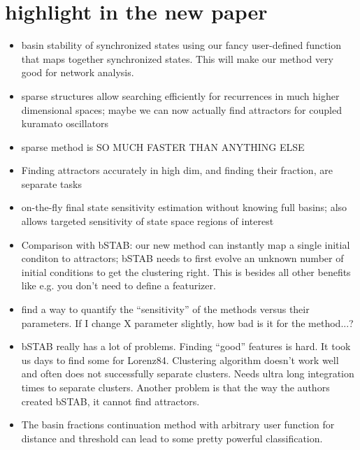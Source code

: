 \documentclass{article}
\begin{document}
\section{highlight in the new paper}
\begin{itemize}
    \item basin stability of synchronized states using our fancy user-defined function that maps together synchronized states. This will make our method very good for network analysis.
    \item sparse structures allow searching efficiently for recurrences in much higher dimensional spaces; maybe we can now actually find attractors for coupled kuramato oscillators
    \item sparse method is SO MUCH FASTER THAN ANYTHING ELSE
    \item Finding attractors accurately in high dim, and finding their fraction, are separate tasks
    \item on-the-fly final state sensitivity estimation without knowing full basins; also allows targeted sensitivity of state space regions of interest
    \item Comparison with bSTAB: our new method can instantly map a single initial conditon to attractors; bSTAB needs to first evolve an unknown number of initial conditions to get the clustering right. This is besides all other benefits like e.g. you don't need to define a featurizer.
    \item find a way to quantify the ``sensitivity'' of the methods versus their parameters. If I change X parameter slightly, how bad is it for the method...?
    \item bSTAB really has a lot of problems. Finding ``good'' features is hard. It took us days to find some for Lorenz84. Clustering algorithm doesn't work well and often does not successfully separate clusters. Needs ultra long integration times to separate clusters. Another problem is that the way the authors created bSTAB, it cannot find attractors.
    \item The basin fractions continuation method with arbitrary user function for distance and threshold can lead to some pretty powerful classification.
\end{itemize}
\end{document}
